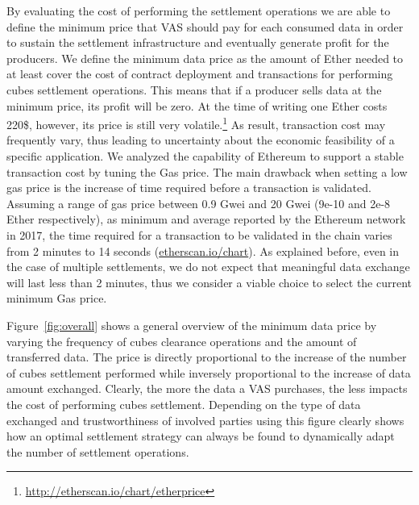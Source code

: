 \documentclass[chi_draft]{sigchi}
\begin{document}
{By evaluating the cost of performing the settlement operations we are able to define the minimum price that VAS should pay for each consumed data in order to sustain the settlement infrastructure and eventually generate profit for the producers.
We define the minimum data price as the amount of Ether needed to at least cover the cost of contract deployment and transactions for performing cubes settlement operations. This means that if a producer sells data at the minimum price, its profit will be zero. 
At the time of writing one Ether costs 220\$, however, its price is still very volatile.\footnote{\url{http://etherscan.io/chart/etherprice}}%
%
As result, transaction cost may frequently vary, thus leading to uncertainty about the economic feasibility of a specific application. We analyzed the capability of Ethereum to support a stable transaction cost by tuning the Gas price. The main drawback when setting a low gas price is the increase of time required before a transaction is validated. Assuming a range of gas price between 0.9 Gwei and 20 Gwei (9e-10 and 2e-8 Ether respectively), as minimum and average reported by the Ethereum network in 2017, the time required for a transaction to be validated in the chain varies from 2 minutes to 14 seconds (\url{etherscan.io/chart}). As explained before, even in the case of multiple settlements, we do not expect that meaningful data exchange will last less than 2 minutes, thus we consider a viable choice to select the current minimum Gas price.


Figure~\ref{fig:overall} shows a general overview of the minimum data price by varying the frequency of cubes clearance operations and the amount of transferred data. The price is directly proportional to the increase of the number of cubes settlement performed while inversely proportional to the increase of data amount exchanged. Clearly, the more the data a VAS purchases, the less impacts the cost of performing cubes settlement. Depending on the type of data exchanged and trustworthiness of involved parties using this figure clearly shows how an optimal settlement strategy can always be found to dynamically adapt the number of settlement operations.

}
\end{document}
